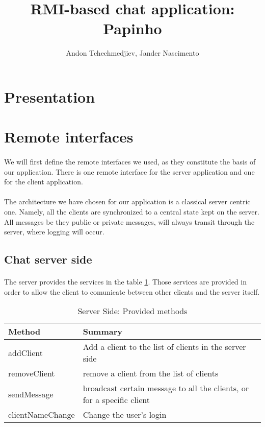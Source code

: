 \documentclass[times, 10pt,twocolumn]{article}
\title {RMI-based chat application: Papinho}
\author{Andon Tchechmedjiev, Jander Nascimento}
\begin{document}
\maketitle
\section{Presentation}
\section{Remote interfaces}

\paragraph{}
We will first define the remote interfaces we used, as they constitute the basis of our application. There is one remote interface for the server application and one for the client application.
\paragraph{}
The architecture we have chosen for our application is a classical server centric one. Namely, all the clients are synchronized to a central state kept on the server. All messages be they public or private messages, will always transit through the server, where logging will occur.

\subsection{Chat server side}
\paragraph{}

The server provides the services in the table \ref{tab:serverprovide}. Those services are provided in order to allow the client to comunicate between other clients and the server itself. 

  \begin{table}[H]
  \begin{center}
      \begin{tabular}{ | l | p{5cm} |}
      \hline
      Method & Summary \\ \hline
      addClient & Add a client to the list of clients in the server side \\ \hline 
      removeClient & remove a client from the list of clients \\ \hline
      sendMessage &  broadcast certain message to all the clients, or for a specific client\\ \hline
      clientNameChange & Change the user's login \\ \hline
      \end{tabular}
  \end{center}
  \caption{Server Side: Provided methods}
  \label{tab:serverprovide}
  \end{table}
\end{document}
